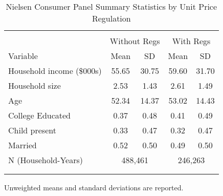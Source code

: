 \begin{table}[!htbp] \centering
\caption{Nielsen Consumer Panel Summary Statistics by Unit Price Regulation}
\label{tab:summaryStatsUnitLaws}
\begin{tabular}{lcccc}
\\[-1.8ex]\hline
\hline \\[-1.8ex]
                          & \multicolumn{2}{c}{Without Regs} & \multicolumn{2}{c}{With Regs} \\
Variable                  & Mean  & SD    & Mean    & SD \\
\hline
Household income (\$000s) & 55.65 & 30.75 & 59.60   & 31.70  \\
Household size            & 2.53  & 1.43  & 2.61    & 1.49   \\
Age                       & 52.34 & 14.37 & 53.02   & 14.43  \\
College Educated          & 0.37  & 0.48  & 0.41    & 0.49   \\
Child present             & 0.33  & 0.47  & 0.32    & 0.47   \\
Married                   & 0.52  & 0.50  & 0.49    & 0.50 \\
N (Household-Years)       & \multicolumn{2}{c}{488,461} & \multicolumn{2}{c}{246,263}\\
\\[-1.8ex]\hline
\hline \\[-1.8ex]
\end{tabular}
\begin{tablenotes}
Unweighted means and standard deviations are reported.
\end{tablenotes}
\end{table}
